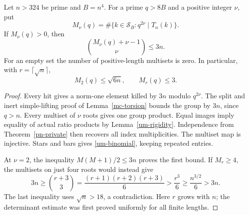 \begin{theorem}\label{um-multisets}
Let \(n>324\) be prime and \(B=n^4\). For a prime \(q>8B\)
and a positive integer \(\nu\), put
\[
 M_\nu(q)=\#\{k\in\mathcal S_B:q^{2\nu}\mid T_n(k)\}.
\]
If \(M_\nu(q)>0\), then
\begin{equation}\label{um-binomial}
 \binom{M_\nu(q)+\nu-1}{\nu}\leq3n.
\end{equation}
For an empty set the number of positive-length multisets is zero.
In particular, with \(r=\lceil\sqrt n\rceil\),
\[
 M_2(q)\leq\sqrt{6n},\qquad M_r(q)\leq3.
\]
\end{theorem}
\begin{proof}
Every hit gives a norm-one element killed by \(3n\) modulo
\(q^{2\nu}\). The split and inert simple-lifting proof of
Lemma~\ref{mc-torsion} bounds the group by \(3n\), since \(q>n\).
Every multiset of \(\nu\) roots gives one group product.
Equal images imply equality of actual ratio products by
Lemma~\ref{um-rigidity}. Independence from
Theorem~\ref{pn-private} then recovers all index multiplicities.
The multiset map is injective. Stars and bars gives
\eqref{um-binomial}, keeping repeated entries.

At \(\nu=2\), the inequality \(M(M+1)/2\leq3n\) proves the
first bound. If \(M_r\geq4\), the multisets on just four roots
would instead give
\[
 3n\geq\binom{r+3}{3}
      =\frac{(r+1)(r+2)(r+3)}6
      >\frac{r^3}6
      \geq\frac{n^{3/2}}6>3n.
\]
The last inequality uses \(\sqrt n>18\), a contradiction.
Here \(r\) grows with \(n\); the determinant estimate was first
proved uniformly for all finite lengths.
\end{proof}

